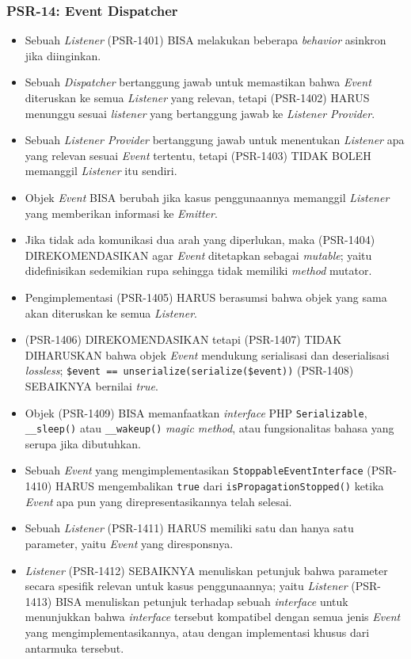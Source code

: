 \subsubsection{PSR-14: Event Dispatcher}
\label{subsubsec:psr14}
\begin{itemize}
	\item Sebuah \textit{Listener} (PSR-1401) BISA melakukan beberapa \textit{behavior} asinkron jika diinginkan.
	\item Sebuah \textit{Dispatcher} bertanggung jawab untuk memastikan bahwa \textit{Event} diteruskan ke semua \textit{Listener} yang relevan, tetapi (PSR-1402) HARUS menunggu sesuai \textit{listener} yang bertanggung jawab ke \textit{Listener Provider}.
	\item Sebuah \textit{Listener Provider} bertanggung jawab untuk menentukan \textit{Listener} apa yang relevan sesuai \textit{Event} tertentu, tetapi (PSR-1403) TIDAK BOLEH memanggil \textit{Listener} itu sendiri.
	\item Objek \textit{Event} BISA berubah jika kasus penggunaannya memanggil \textit{Listener} yang memberikan informasi ke \textit{Emitter}.
	\item Jika tidak ada komunikasi dua arah yang diperlukan, maka (PSR-1404) DIREKOMENDASIKAN agar \textit{Event} ditetapkan sebagai \textit{mutable}; yaitu didefinisikan sedemikian rupa sehingga tidak memiliki \textit{method} mutator.
	\item Pengimplementasi (PSR-1405) HARUS berasumsi bahwa objek yang sama akan diteruskan ke semua \textit{Listener}.
	\item (PSR-1406) DIREKOMENDASIKAN tetapi (PSR-1407) TIDAK DIHARUSKAN bahwa objek \textit{Event} mendukung serialisasi dan deserialisasi \textit{lossless}; \verb|$event == unserialize(serialize($event))| (PSR-1408) SEBAIKNYA bernilai  \textit{true}.
	\item Objek (PSR-1409) BISA memanfaatkan \textit{interface} PHP \verb|Serializable|, \verb|__sleep()| atau \verb|__wakeup()| \textit{magic method}, atau fungsionalitas bahasa yang serupa jika dibutuhkan.
	\item Sebuah \textit{Event} yang mengimplementasikan \verb|StoppableEventInterface| (PSR-1410) HARUS mengembalikan \verb|true| dari \verb|isPropagationStopped()| ketika \textit{Event} apa pun yang direpresentasikannya telah selesai.
	\item Sebuah \textit{Listener} (PSR-1411) HARUS memiliki satu dan hanya satu parameter, yaitu \textit{Event} yang diresponsnya.
	\item \textit{Listener} (PSR-1412) SEBAIKNYA menuliskan petunjuk bahwa parameter secara spesifik relevan untuk kasus penggunaannya; yaitu \textit{Listener} (PSR-1413) BISA menuliskan petunjuk terhadap sebuah \textit{interface} untuk menunjukkan bahwa \textit{interface} tersebut kompatibel dengan semua jenis \textit{Event} yang mengimplementasikannya, atau dengan implementasi khusus dari antarmuka tersebut.
\end{itemize}

